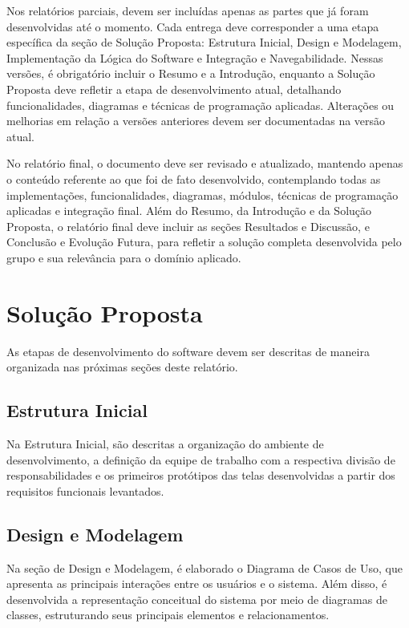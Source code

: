 \documentclass{article}
\begin{document}
Nos relatórios parciais, devem ser incluídas apenas as partes que já foram desenvolvidas até o momento. Cada entrega deve corresponder a uma etapa específica da seção de Solução Proposta: Estrutura Inicial, Design e Modelagem, Implementação da Lógica do Software e Integração e Navegabilidade. Nessas versões, é obrigatório incluir o Resumo e a Introdução, enquanto a Solução Proposta deve refletir a etapa de desenvolvimento atual, detalhando funcionalidades, diagramas e técnicas de programação aplicadas. Alterações ou melhorias em relação a versões anteriores devem ser documentadas na versão atual. 

No relatório final, o documento deve ser revisado e atualizado, mantendo apenas o conteúdo referente ao que foi de fato desenvolvido, contemplando todas as implementações, funcionalidades, diagramas, módulos, técnicas de programação aplicadas e integração final. Além do Resumo, da Introdução e da Solução Proposta, o relatório final deve incluir as seções Resultados e Discussão, e Conclusão e Evolução Futura, para refletir a solução completa desenvolvida pelo grupo e sua relevância para o domínio aplicado.

\section{Solução Proposta}
\label{sec:proposta}

As etapas de desenvolvimento do software devem ser descritas de maneira organizada nas próximas seções deste relatório.

\subsection{Estrutura Inicial}

Na Estrutura Inicial, são descritas a organização do ambiente de desenvolvimento, a definição da equipe de trabalho com a respectiva divisão de responsabilidades e os primeiros protótipos das telas desenvolvidas a partir dos requisitos funcionais levantados. 

\subsection{Design e Modelagem}

Na seção de Design e Modelagem, é elaborado o Diagrama de Casos de Uso, que apresenta as principais interações entre os usuários e o sistema. Além disso, é desenvolvida a representação conceitual do sistema por meio de diagramas de classes, estruturando seus principais elementos e relacionamentos.
\end{document}
